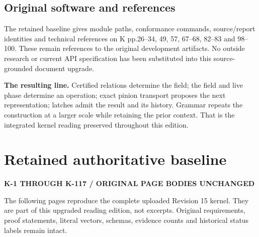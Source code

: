 \documentclass[11pt,a4paper]{article}
\newcommand{\status}[1]{{\sffamily\bfseries\scriptsize\color{teal}#1}\par}
\theoremstyle{lpstyle}
\begin{document}
\subsection{Original software and references}
The retained baseline gives module paths, conformance commands, source/report identities and technical references on K pp.26--34, 49, 57, 67--68, 82--83 and 98--100. These remain references to the original development artifacts. No outside research or current API specification has been substituted into this source-grounded document upgrade.

\begin{principle}
\textbf{The resulting line.} Certified relations determine the field; the field and live phase determine an operation; exact pinion transport proposes the next representation; latches admit the result and its history. Grammar repeats the construction at a larger scale while retaining the prior context. That is the integrated kernel reading preserved throughout this edition.
\end{principle}

\clearpage
{}\section*{Retained authoritative baseline}
\status{K-1 THROUGH K-117 / ORIGINAL PAGE BODIES UNCHANGED}
The following pages reproduce the complete uploaded Revision 15 kernel. They are part of this upgraded reading edition, not excerpts. Original requirements, proof statements, literal vectors, schemas, evidence counts and historical status labels remain intact.
\end{document}
